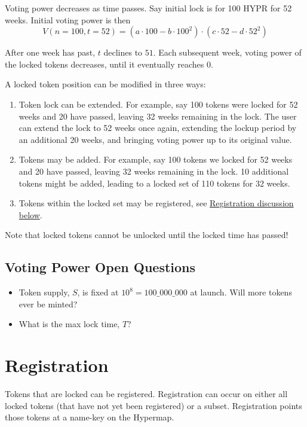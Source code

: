 \documentclass{article}
\begin{document}
Voting power decreases as time passes.
Say initial lock is for 100 HYPR for 52 weeks.
Initial voting power is then
\begin{equation}
V(n=100, t=52) = (a\cdot 100 - b\cdot 100^2) \cdot (c\cdot 52 - d\cdot 52^2)
\end{equation}

After one week has past, $t$ declines to $51$.
Each subsequent week, voting power of the locked tokens decreases, until it eventually reaches $0$.

A locked token position can be modified in three ways:
\begin{enumerate}
    \item Token lock can be extended.
       For example, say 100 tokens were locked for 52 weeks and 20 have passed, leaving 32 weeks remaining in the lock.
       The user can extend the lock to 52 weeks once again, extending the lockup period by an additional 20 weeks, and bringing voting power up to its original value.
    \item Tokens may be added.
       For example, say 100 tokens we locked for 52 weeks and 20 have passed, leaving 32 weeks remaining in the lock.
       10 additional tokens might be added, leading to a locked set of 110 tokens for 32 weeks.
    \item Tokens within the locked set may be registered, see \hyperref[sec:registration]{Registration discussion below}.
\end{enumerate}

Note that locked tokens cannot be unlocked until the locked time has passed!

\subsection{Voting Power Open Questions}
\begin{itemize}
    \item Token supply, $S$, is fixed at $10^8 = 100\_000\_000$ at launch.
      Will more tokens ever be minted?
    \item What is the max lock time, $T$?
\end{itemize}

\section{Registration}\label{sec:registration}

Tokens that are locked can be registered.
Registration can occur on either all locked tokens (that have not yet been registered) or a subset.
Registration points those tokens at a name-key on the Hypermap.
\end{document}
